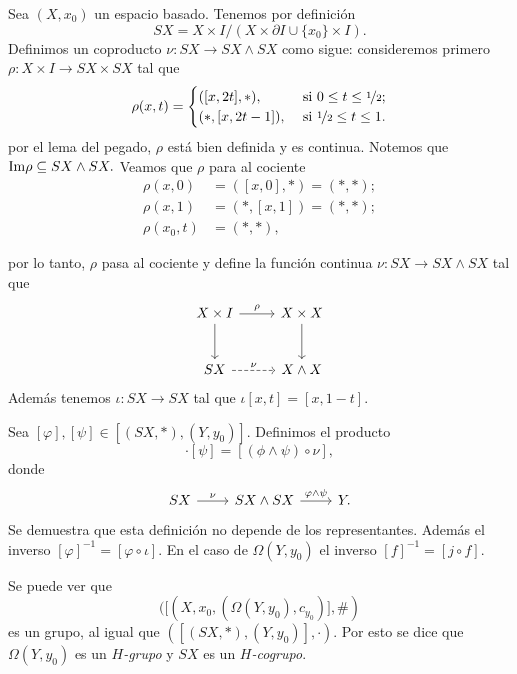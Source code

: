 \begin{definicion}
    Sea $(X,x_0)$ un espacio basado. Tenemos por definición
    \begin{equation*}
        SX=X\times I/(X\times\partial I\cup \{x_0\}\times I).
    \end{equation*}
    Definimos un coproducto $\nu:SX\to SX\wedge SX$ como sigue: consideremos primero $\rho: X\times I\to SX\times SX$ tal que
    \begin{equation*}
        \rho(x,t)=\begin{cases}
            ([x,2t],*),   &\text{ si } 0\leq t\leq \nicefrac{1}{2};\\
            (*,[x,2t-1]), &\text{ si } \nicefrac{1}{2}\leq t\leq 1.
        \end{cases}
    \end{equation*}
    por el lema del pegado, $\rho$ está bien definida y es continua. Notemos que $\mathrm{Im}\rho\subseteq SX\wedge SX.  $ 
    Veamos que $\rho$ para al cociente 
    \begin{align*}
        \rho(x,0)&=([x,0],*)=(*,*);\\
        \rho(x,1)&=(*,[x,1])=(*,*);\\
        \rho(x_0,t)&=(*,*),
    \end{align*}
\end{definicion}
por lo tanto, $\rho$ pasa al cociente y define la función continua $\nu:SX\to SX\wedge SX$ tal que
\begin{equation*}
    \begin{tikzcd}[column sep=0.9cm, row sep =0.9cm]
        X\times I\arrow[r,"\rho"] \arrow[d]& X\times X\arrow[d]\\
        SX\arrow[r,"\nu", dashed] & X\wedge X
    \end{tikzcd}
\end{equation*}
Además tenemos $\iota:SX\to SX$ tal que $\iota[x,t]=[x,1-t]$.
\begin{definicion}
    Sea $[\varphi],[\psi]\in[(SX,*),(Y,y_0)]$. Definimos el producto 
    \begin{equation*}
        [\varphi]\cdot[\psi]=[(\phi\wedge \psi)\circ\nu],
    \end{equation*}
    donde  
    \begin{equation*}
        \begin{tikzcd}[column sep=0.8cm]
            SX\arrow[r, "\nu"] & SX\wedge SX\arrow[r, "\varphi\wedge \psi"] & Y.
        \end{tikzcd}
    \end{equation*}
    Se demuestra que esta definición no depende de los representantes. Además el inverso $[\varphi]^{-1}=[\varphi\circ\iota]$. En el caso de $\Omega(Y,y_0)$ el inverso $[f]^{-1}=[j\circ f]$.

    Se puede ver que 
    $$([(X,x_0,(\Omega(Y,y_0),c_{y_0})],\#)$$ 
    es un grupo, al igual que $([(SX,*),(Y,y_0)],\cdot)$. Por esto se dice que $\Omega(Y,y_0)$ es un \textit{$H$-grupo} y $SX$ es un \textit{$H$-cogrupo}.
\end{definicion}

